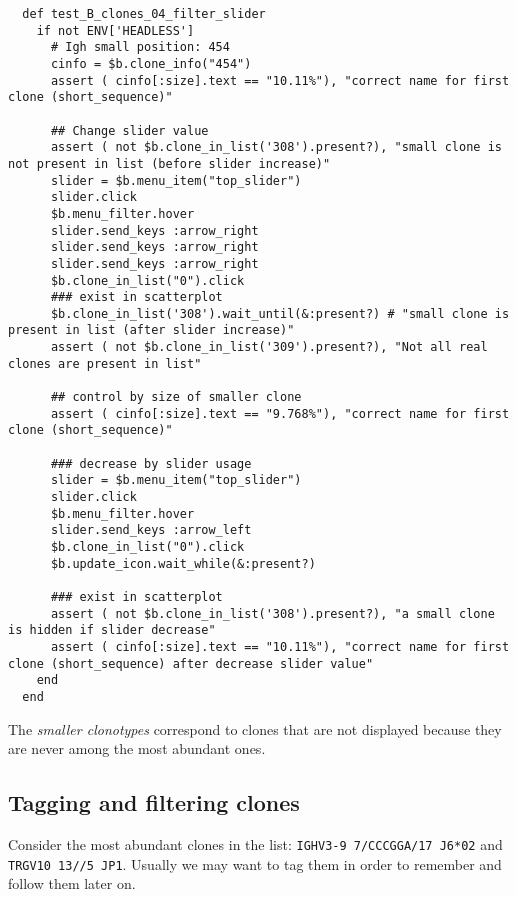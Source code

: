 \begin{verbatim}
  def test_B_clones_04_filter_slider
    if not ENV['HEADLESS']
      # Igh small position: 454
      cinfo = $b.clone_info("454")
      assert ( cinfo[:size].text == "10.11%"), "correct name for first clone (short_sequence)"

      ## Change slider value
      assert ( not $b.clone_in_list('308').present?), "small clone is not present in list (before slider increase)"
      slider = $b.menu_item("top_slider")
      slider.click
      $b.menu_filter.hover
      slider.send_keys :arrow_right 
      slider.send_keys :arrow_right
      slider.send_keys :arrow_right
      $b.clone_in_list("0").click
      ### exist in scatterplot
      $b.clone_in_list('308').wait_until(&:present?) # "small clone is present in list (after slider increase)"
      assert ( not $b.clone_in_list('309').present?), "Not all real clones are present in list"

      ## control by size of smaller clone
      assert ( cinfo[:size].text == "9.768%"), "correct name for first clone (short_sequence)"

      ### decrease by slider usage
      slider = $b.menu_item("top_slider")
      slider.click
      $b.menu_filter.hover
      slider.send_keys :arrow_left 
      $b.clone_in_list("0").click
      $b.update_icon.wait_while(&:present?)

      ### exist in scatterplot
      assert ( not $b.clone_in_list('308').present?), "a small clone is hidden if slider decrease"
      assert ( cinfo[:size].text == "10.11%"), "correct name for first clone (short_sequence) after decrease slider value"
    end
  end
\end{verbatim}

The \textit{smaller clonotypes} correspond to clones that are not displayed
because they are never among the most abundant ones.


\subsection{Tagging and filtering clones}

Consider the most abundant clones in the list:  \texttt{IGHV3-9 7/CCCGGA/17 J6*02} and  \texttt{TRGV10 13//5 JP1}.
Usually we may want to tag them in order to remember and follow them later on.

